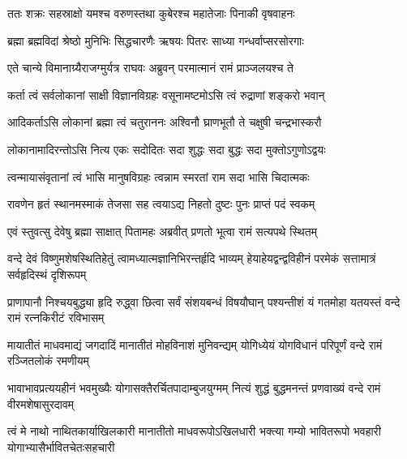 

\addtocounter{shlokacount}{9}

\twolineshloka
{ततः शक्रः सहस्राक्षो यमश्च वरुणस्तथा}
{कुबेरश्च महातेजाः पिनाकी वृषवाहनः} %

\twolineshloka
{ब्रह्मा ब्रह्मविदां श्रेष्ठो मुनिभिः सिद्धचारणैः}
{ऋषयः पितरः साध्या गन्धर्वाप्सरसोरगाः} %

\twolineshloka
{एते चान्ये विमानाग्र्यैराजग्मुर्यत्र राघवः}
{अब्रुवन् परमात्मानं रामं प्राञ्जलयश्च ते} %

\twolineshloka
{कर्ता त्वं सर्वलोकानां साक्षी विज्ञानविग्रहः}
{वसूनामष्टमोऽसि त्वं रुद्राणां शङ्करो भवान्} %

\twolineshloka
{आदिकर्ताऽसि लोकानां ब्रह्मा त्वं चतुराननः}
{अश्विनौ घ्राणभूतौ ते चक्षुषी चन्द्रभास्करौ} %

\twolineshloka
{लोकानामादिरन्तोऽसि नित्य एकः सदोदितः}
{सदा शुद्धः सदा बुद्धः सदा मुक्तोऽगुणोऽद्वयः} %

\twolineshloka
{त्वन्मायासंवृतानां त्वं भासि मानुषविग्रहः}
{त्वन्नाम स्मरतां राम सदा भासि चिदात्मकः} %

\twolineshloka
{रावणेन हृतं स्थानमस्माकं तेजसा सह}
{त्वयाऽद्य निहतो दुष्टः पुनः प्राप्तं पदं स्वकम्} %

\twolineshloka
{एवं स्तुवत्सु देवेषु ब्रह्मा साक्षात् पितामहः}
{अब्रवीत् प्रणतो भूत्वा रामं सत्यपथे स्थितम्} %



\fourlineindentedshloka
{वन्दे देवं विष्णुमशेषस्थितिहेतुं}
{त्वामध्यात्मज्ञानिभिरन्तर्हृदि भाव्यम्}
{हेयाहेयद्वन्द्वविहीनं परमेकं}
{सत्तामात्रं सर्वहृदिस्थं दृशिरूपम्} %

\fourlineindentedshloka
{प्राणापानौ निश्चयबुद्ध्या हृदि रुद्ध्वा}
{छित्वा सर्वं संशयबन्धं विषयौघान्}
{पश्यन्तीशं यं गतमोहा यतयस्तं}
{वन्दे रामं रत्नकिरीटं रविभासम्} %

\fourlineindentedshloka
{मायातीतं माधवमाद्यं जगदादिं}
{मानातीतं मोहविनाशं मुनिवन्द्यम्}
{योगिध्येयं योगविधानं परिपूर्णं}
{वन्दे रामं रञ्जितलोकं रमणीयम्} %

\fourlineindentedshloka
{भावाभावप्रत्ययहीनं भवमुख्यैः}
{योगासक्तैरर्चितपादाम्बुजयुग्मम्}
{नित्यं शुद्धं बुद्धमनन्तं प्रणवाख्यं}
{वन्दे रामं वीरमशेषासुरदावम्} %

\fourlineindentedshloka
{त्वं मे नाथो नाथितकार्याखिलकारी}
{मानातीतो माधवरूपोऽखिलधारी}
{भक्त्या गम्यो भावितरूपो भवहारी}
{योगाभ्यासैर्भावितचेतःसहचारी} %


